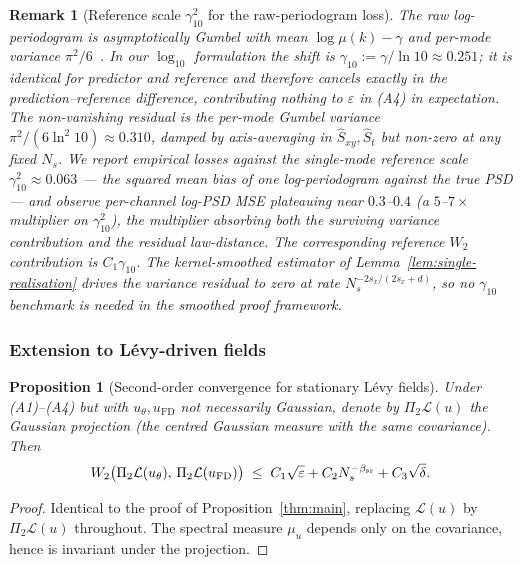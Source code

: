 \documentclass[review,12pt]{elsarticle}
\newtheorem{remark}{Remark}
\newtheorem{proposition}{Proposition}
\begin{document}
\begin{remark}[Reference scale \(\gamma_{10}^2\) for the
raw-periodogram loss]
\label{rem:em-floor}
The raw log-periodogram is asymptotically Gumbel with mean
\(\log\mu(k) - \gamma\) and per-mode variance
\(\pi^2/6\)~\cite[Ch.~5]{Brillinger1981}. In our \(\log_{10}\)
formulation the shift is \(\gamma_{10} := \gamma/\ln 10 \approx 0.251\);
it is identical for predictor and reference and therefore cancels
exactly in the prediction--reference difference, contributing
nothing to \(\varepsilon\) in (A4) in expectation. The non-vanishing
residual is the per-mode Gumbel variance
\(\pi^2/(6\ln^2\!10) \approx 0.310\), damped by axis-averaging in
\(\widehat S_{xy}, \widehat S_t\) but non-zero at any fixed \(N_s\).
We report empirical losses against the single-mode reference scale
\(\gamma_{10}^2 \approx 0.063\) --- the squared mean bias of one
log-periodogram against the true PSD --- and observe per-channel
log-PSD MSE plateauing near \(0.3\)--\(0.4\) (a \(5\)--\(7\times\)
multiplier on \(\gamma_{10}^2\)), the multiplier absorbing both the
surviving variance contribution and the residual law-distance. The
corresponding reference \(W_2\) contribution is \(C_1\gamma_{10}\).
The kernel-smoothed estimator of
Lemma~\ref{lem:single-realisation} drives the variance residual to
zero at rate \(N_s^{-2s_x/(2s_x+d)}\), so no \(\gamma_{10}\)
benchmark is needed in the smoothed proof framework.
\end{remark}

\subsubsection{Extension to L\'evy-driven fields}

\begin{proposition}[Second-order convergence for stationary L\'evy fields]
\label{thm:levy-ext}
Under (A1)--(A4) but with \(u_\theta, u_{\mathrm{FD}}\) not
necessarily Gaussian, denote by \(\Pi_2\mathcal L(u)\) the Gaussian
projection (the centred Gaussian measure with the same covariance).
Then
\[
W_2\bigl(\Pi_2\mathcal L(u_\theta),\,
\Pi_2\mathcal L(u_{\mathrm{FD}})\bigr)
\;\le\; C_1\sqrt\varepsilon + C_2 N_s^{-\beta_{\rm sr}} + C_3\sqrt\delta.
\]
\end{proposition}
\begin{proof}
Identical to the proof of Proposition~\ref{thm:main}, replacing
\(\mathcal L(u)\) by \(\Pi_2\mathcal L(u)\) throughout. The spectral
measure \(\mu_u\) depends only on the covariance, hence is invariant
under the projection.
\end{proof}
\end{document}
